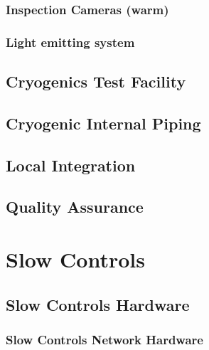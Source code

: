 \subsubsection{Inspection Cameras (warm)}

\subsubsection{Light emitting system}


\subsection{Cryogenics Test Facility}
\label{sec:fdsp-slow-cryo-test-facil}

\subsection{Cryogenic Internal Piping}
\label{sec:fdsp-slow-cryo-int-piping}

\subsection{Local Integration}
\label{sec:fdsp-slow-cryo-loc-integ}


\subsection{Quality Assurance}
\label{sec:fdsp-slow-cryo-qa}



\section{Slow Controls}
\label{sec:fdsp-slow-cryo-ctrl}




\subsection{Slow Controls Hardware}
\label{sec:fdsp-slow-cryo-hdwr}

\subsubsection{Slow Controls Network Hardware}


